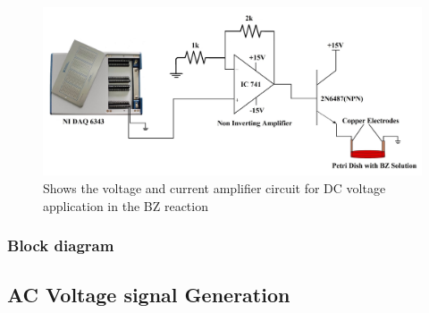 \documentclass[journal=jacsat,manuscript=article]{achemso}
\begin{document}
\begin{figure}[H]
    \centering
    \includegraphics[width=\linewidth]{pulse circuit - Copy.jpg}
    \caption{Shows the voltage and current amplifier circuit for DC
      voltage application in the BZ reaction}
    \label{fig:ex2}
\end{figure}



\subsubsection{Block diagram}
 

\subsection{AC Voltage signal Generation}
\end{document}
